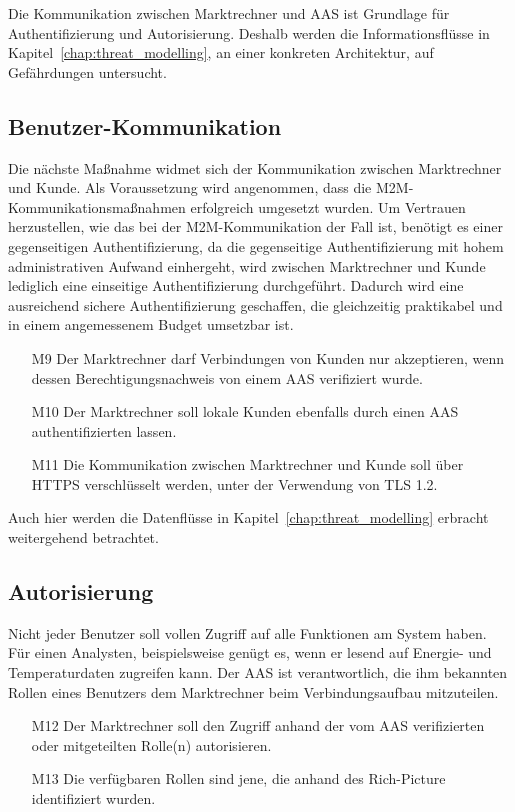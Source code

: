 \documentclass[11pt,a4paper]{report}
\begin{document}
Die Kommunikation zwischen Marktrechner und AAS ist Grundlage für Authentifizierung und Autorisierung. Deshalb werden die Informationsflüsse in Kapitel~\ref{chap:threat_modelling}, an einer konkreten Architektur, auf Gefährdungen untersucht.

\subsection{Benutzer-Kommunikation} 
Die nächste Maßnahme widmet sich der Kommunikation zwischen Marktrechner und Kunde. Als Voraussetzung wird angenommen, dass die M2M-Kommunikations\-maßnahmen erfolgreich umgesetzt wurden. Um Vertrauen herzustellen, wie das bei der M2M-Kommunikation der Fall ist, benötigt es einer gegenseitigen Authentifizierung, da die gegenseitige Authentifizierung mit hohem administrativen Aufwand einhergeht, wird zwischen Marktrechner und Kunde lediglich eine einseitige Authentifizierung durchgeführt. Dadurch wird eine ausreichend sichere Authentifizierung geschaffen, die gleichzeitig praktikabel und in einem angemessenem Budget umsetzbar ist.

\begin{enumerate}
\item[M9] Der Marktrechner darf Verbindungen von Kunden nur akzeptieren, wenn dessen Berechtigungsnachweis von einem AAS verifiziert wurde.
\item[M10] Der Marktrechner soll lokale Kunden ebenfalls durch einen AAS authentifizierten lassen.
\item[M11] Die Kommunikation zwischen Marktrechner und Kunde soll über HTTPS verschlüsselt werden, unter der Verwendung von TLS 1.2.
\end{enumerate}

Auch hier werden die Datenflüsse in Kapitel~\ref{chap:threat_modelling} erbracht weitergehend betrachtet.

\subsection{Autorisierung}
Nicht jeder Benutzer soll vollen Zugriff auf alle Funktionen am System haben. Für einen Analysten, beispielsweise genügt es, wenn er lesend auf Energie- und Temperaturdaten zugreifen kann. Der AAS ist verantwortlich, die ihm bekannten Rollen eines Benutzers dem Marktrechner beim Verbindungsaufbau mitzuteilen.

\begin{enumerate}
\item[M12] Der Marktrechner soll den Zugriff anhand der vom AAS verifizierten oder mitgeteilten Rolle(n) autorisieren.
\item[M13] Die verfügbaren Rollen sind jene, die anhand des Rich-Picture identifiziert wurden.
\end{enumerate}
\end{document}
